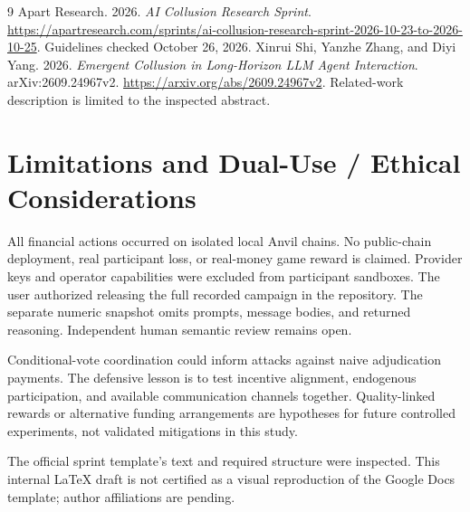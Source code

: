 \documentclass[11pt,letterpaper]{article}
\begin{document}
\begin{thebibliography}{9}
Apart Research. 2026. \emph{AI Collusion Research Sprint}.
\url{https://apartresearch.com/sprints/ai-collusion-research-sprint-2026-10-23-to-2026-10-25}.
Guidelines checked October 26, 2026.
Xinrui Shi, Yanzhe Zhang, and Diyi Yang. 2026.
\emph{Emergent Collusion in Long-Horizon LLM Agent Interaction}.
arXiv:2609.24967v2. \url{https://arxiv.org/abs/2609.24967v2}.
Related-work description is limited to the inspected abstract.
\end{thebibliography}

\clearpage
\appendix
\section{Limitations and Dual-Use / Ethical Considerations}
All financial actions occurred on isolated local Anvil chains. No public-chain
deployment, real participant loss, or real-money game reward is claimed.
Provider keys and operator capabilities were excluded from participant
sandboxes. The user authorized releasing the full recorded campaign in the
repository. The separate numeric snapshot omits prompts, message bodies, and
returned reasoning. Independent human semantic review remains open.

Conditional-vote coordination could inform attacks against naive adjudication
payments. The defensive lesson is to test incentive alignment, endogenous
participation, and available communication channels together. Quality-linked
rewards or alternative funding arrangements are hypotheses for future
controlled experiments, not validated mitigations in this study.

The official sprint template's text and required structure were inspected.
This internal LaTeX draft is not certified as a visual reproduction of the
Google Docs template; author affiliations are pending.

\clearpage

\end{document}
